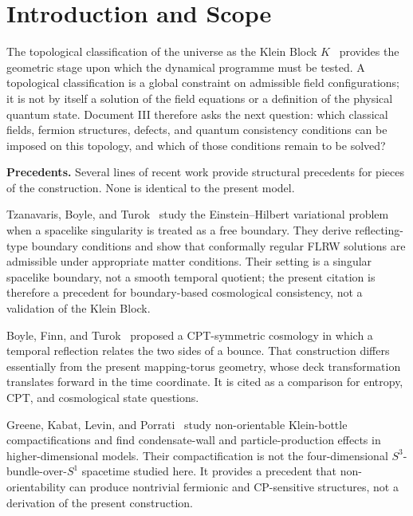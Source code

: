 \documentclass[11pt]{article}
\theoremstyle{canonmath}
\theoremstyle{canonpostulate}
\theoremstyle{canonclaim}
\providecommand{\Klein}{\mathcal{K}}
\providecommand{\Sone}{S^1}
\providecommand{\Sthree}{S^3}
\def\mathcal#1{#1}%
\begin{document}

\newpage
{}
\tableofcontents
\newpage
{}
\setcounter{page}{1}

\section{Introduction and Scope}
\label{sec:intro}

The topological classification of the universe as the Klein Block $\Klein$~\cite{CanonWhat} provides the geometric stage upon which the dynamical programme must be tested. A topological classification is a global constraint on admissible field configurations; it is not by itself a solution of the field equations or a definition of the physical quantum state. Document III therefore asks the next question: which classical fields, fermion structures, defects, and quantum consistency conditions can be imposed on this topology, and which of those conditions remain to be solved?

\textbf{Precedents.} Several lines of recent work provide structural precedents for pieces of the construction. None is identical to the present model.

Tzanavaris, Boyle, and Turok~\cite{Turok2026} study the Einstein--Hilbert variational problem when a spacelike singularity is treated as a free boundary. They derive reflecting-type boundary conditions and show that conformally regular FLRW solutions are admissible under appropriate matter conditions. Their setting is a singular spacelike boundary, not a smooth temporal quotient; the present citation is therefore a precedent for boundary-based cosmological consistency, not a validation of the Klein Block.

Boyle, Finn, and Turok~\cite{BoyleFinnTurok} proposed a CPT-symmetric cosmology in which a temporal reflection relates the two sides of a bounce. That construction differs essentially from the present mapping-torus geometry, whose deck transformation translates forward in the time coordinate. It is cited as a comparison for entropy, CPT, and cosmological state questions.

Greene, Kabat, Levin, and Porrati~\cite{Greene2026,GreeneCompact} study non-orientable Klein-bottle compactifications and find condensate-wall and particle-production effects in higher-dimensional models. Their compactification is not the four-dimensional $\Sthree$-bundle-over-$\Sone$ spacetime studied here. It provides a precedent that non-orientability can produce nontrivial fermionic and CP-sensitive structures, not a derivation of the present construction.
\end{document}
